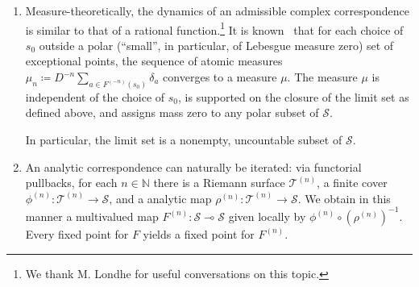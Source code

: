 \documentclass{amsart}
\newcommand\N{{\mathbb{N}}}
\theoremstyle{definition}
\theoremstyle{remark}
\newcommand{\cT}{\mathcal{T}}
\newcommand{\cS}{\mathcal{S}}
\newcommand{\cusps}[1]{\text{\sc cusps}(#1)}
\begin{document}
\begin{enumerate}
  To see this, let $s_0,s_1,\dots$ be a backward orbit of $s$. Suppose first $s\in \text{acc}(F^{-\N}(s_0)) \cap \cS$.  Pick some other $s_0'\in \cS$.  Join $s_0$ to $s_0'$ by a path of $\cS $-hyperbolic length say $L$.  By weak hyperbolicity and path-lifting, there is a backward orbit $s_0', s_1', s_2', \ldots$ such that the hyperbolic distances between $s_n, s_n'$ satisfy $|s_n-s_n'|<L$ for each $n$. If some subsequence $s_{n_k}\to s\in \cS$ then since $\|dF^{-1}\|_{\cS, \cS} < \lambda < 1$ in e.g.\ a $2L$-neighborhood of $s$ we have $|s_{n_k}-s_{n_k}'|\to 0$. If some subsequence $s_{n_k}\to s\in \cusps{\cS}$ then we also have $s_{n_k'}\to s$ since hyperbolic balls about $s_{n_k}$ of fixed radius $2L$ become smaller and smaller in any compatible metric on $\overline{\cS}$ as $s_{n_k}\to s$. A similar argument treats the case when $s\in \cusps{\cS}$.

Thus the \emph{limit set} $\Lambda(\phi, \rho\colon \cT \rightrightarrows\cS) \subset \overline{\cS}$, defined as $\text{acc}(F^{-\N}(s_0))$ for some (equivalently, any) $s_0\in \cS$ is well-defined, and backward-invariant in the sense that $F^{-1}(\Lambda)=\Lambda$.  

\item Measure-theoretically, the dynamics of an admissible complex correspondence is similar to that of a rational function.\footnote{We thank M. Londhe for useful conversations on this topic.}  It is known~\cite{MR4104599} that for each choice of $s_0$ outside a polar (``small'', in particular, of Lebesgue measure zero) set of exceptional points, the sequence of atomic measures $\mu_n\coloneqq D^{-n}\sum_{a\in F^{(-n)}(s_0)}\delta_a$ converges to a measure $\mu$.  The measure $\mu$ is independent of the choice of $s_0$, is supported on the closure of the limit set as defined above, and assigns mass zero to any polar subset of $\cS$.

In particular, the limit set is a nonempty, uncountable subset of $\cS$.  

\item An analytic correspondence can naturally be iterated: via functorial pullbacks, for each $n\in \N$ there is a Riemann surface $\cT^{(n)}$,  a finite cover $\phi^{(n)}\colon \cT^{(n)}\to\cS$,  and a analytic map $\rho^{(n)}\colon \cT^{(n)}\to\cS$.  We obtain in this manner a multivalued map $F^{(n)}\colon \cS \multimap \cS$ given locally by $\phi^{(n)}\circ (\rho^{(n)})^{-1}$.  Every fixed point for $F$ yields a fixed point for $F^{(n)}$. 


\end{enumerate}
\end{document}
